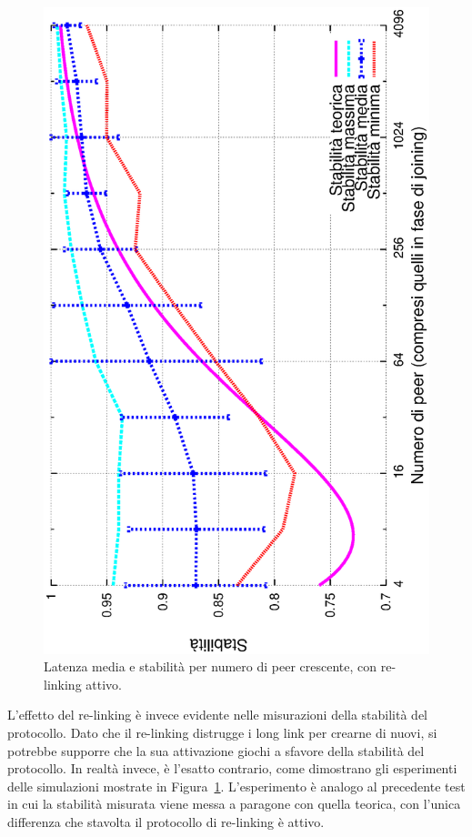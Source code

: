 \documentclass[prodmode,acmtap]{acmlarge}
\begin{document}
\begin{figure}
\includegraphics[scale=.32, angle=-90]{imgs/relink-conc-stability2-stab.eps}
\caption{Latenza media e stabilità per numero di peer crescente, con re-linking attivo.}
\label{img:relink-conc}
\end{figure}

L'effetto del re-linking è invece evidente nelle misurazioni della stabilità del protocollo. Dato che il re-linking distrugge i long link per crearne di nuovi, si potrebbe supporre che la sua attivazione giochi a sfavore della stabilità del protocollo. In realtà invece, è l'esatto contrario, come dimostrano gli esperimenti delle simulazioni mostrate in Figura~\ref{img:relink-conc}. L'esperimento è analogo al precedente test in cui la stabilità misurata viene messa a paragone con quella teorica, con l'unica differenza che stavolta il protocollo di re-linking è attivo.
\end{document}
